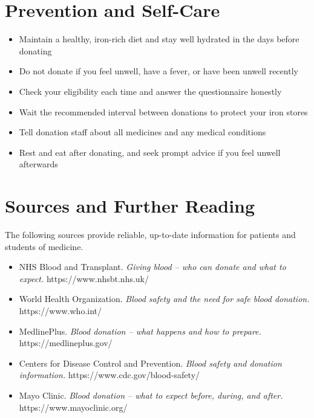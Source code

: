 \section*{Prevention and Self-Care}
\begin{itemize}
    \item Maintain a healthy, iron-rich diet and stay well hydrated in the days before donating
    \item Do not donate if you feel unwell, have a fever, or have been unwell recently
    \item Check your eligibility each time and answer the questionnaire honestly
    \item Wait the recommended interval between donations to protect your iron stores
    \item Tell donation staff about all medicines and any medical conditions
    \item Rest and eat after donating, and seek prompt advice if you feel unwell afterwards
\end{itemize}

\section*{Sources and Further Reading}
The following sources provide reliable, up-to-date information for patients and students of medicine.

\begin{itemize}
    \item NHS Blood and Transplant. \textit{Giving blood -- who can donate and what to expect.} https://www.nhsbt.nhs.uk/
    \item World Health Organization. \textit{Blood safety and the need for safe blood donation.} https://www.who.int/
    \item MedlinePlus. \textit{Blood donation -- what happens and how to prepare.} https://medlineplus.gov/
    \item Centers for Disease Control and Prevention. \textit{Blood safety and donation information.} https://www.cdc.gov/blood-safety/
    \item Mayo Clinic. \textit{Blood donation -- what to expect before, during, and after.} https://www.mayoclinic.org/
\end{itemize}
